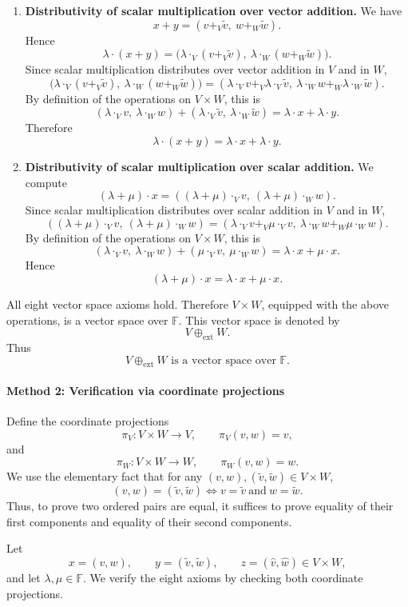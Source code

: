 \documentclass[12pt]{article}
\begin{document}
\begin{enumerate}[label=\textbf{A\arabic*.}]
\newpage
\item \textbf{Distributivity of scalar multiplication over vector addition.}  
We have
\[
x+y=(v+_V\tilde v,\ w+_W\tilde w).
\]
Hence
\[
\lambda\cdot (x+y)
=
\bigl(\lambda\cdot_V(v+_V\tilde v),\ \lambda\cdot_W(w+_W\tilde w)\bigr).
\]
Since scalar multiplication distributes over vector addition in \(V\) and in \(W\),
\[
\bigl(\lambda\cdot_V(v+_V\tilde v),\ \lambda\cdot_W(w+_W\tilde w)\bigr)
=
(\lambda\cdot_V v+_V\lambda\cdot_V\tilde v,\ \lambda\cdot_W w+_W\lambda\cdot_W\tilde w).
\]
By definition of the operations on \(V\times W\), this is
\[
(\lambda\cdot_V v,\ \lambda\cdot_W w)+(\lambda\cdot_V\tilde v,\ \lambda\cdot_W\tilde w)
=
\lambda\cdot x+\lambda\cdot y.
\]
Therefore
\[
\lambda\cdot(x+y)=\lambda\cdot x+\lambda\cdot y.
\]

\item \textbf{Distributivity of scalar multiplication over scalar addition.}  
We compute
\[
(\lambda+\mu)\cdot x
=
((\lambda+\mu)\cdot_V v,\ (\lambda+\mu)\cdot_W w).
\]
Since scalar multiplication distributes over scalar addition in \(V\) and in \(W\),
\[
((\lambda+\mu)\cdot_V v,\ (\lambda+\mu)\cdot_W w)
=
(\lambda\cdot_V v+_V\mu\cdot_V v,\ \lambda\cdot_W w+_W\mu\cdot_W w).
\]
By definition of the operations on \(V\times W\), this is
\[
(\lambda\cdot_V v,\ \lambda\cdot_W w)+(\mu\cdot_V v,\ \mu\cdot_W w)
=
\lambda\cdot x+\mu\cdot x.
\]
Hence
\[
(\lambda+\mu)\cdot x=\lambda\cdot x+\mu\cdot x.
\]
\end{enumerate}

All eight vector space axioms hold. Therefore \(V\times W\), equipped with the above operations, is a vector space over \(\mathbb F\). This vector space is denoted by
\[
V\oplus_{\mathrm{ext}}W.
\]
Thus
\[
\boxed{V\oplus_{\mathrm{ext}}W\text{ is a vector space over }\mathbb F.}
\]

\newpage
\paragraph{Method 2: Verification via coordinate projections}
Define the coordinate projections
\[
\pi_V:V\times W\to V,\qquad \pi_V(v,w)=v,
\]
and
\[
\pi_W:V\times W\to W,\qquad \pi_W(v,w)=w.
\]
We use the elementary fact that for any \((v,w),(\tilde v,\tilde w)\in V\times W\),
\[
(v,w)=(\tilde v,\tilde w)
\iff
v=\tilde v\ \text{and}\ w=\tilde w.
\]
Thus, to prove two ordered pairs are equal, it suffices to prove equality of their first components and equality of their second components.

Let
\[
x=(v,w),\qquad y=(\tilde v,\tilde w),\qquad z=(\hat v,\hat w)\in V\times W,
\]
and let \(\lambda,\mu\in\mathbb F\). We verify the eight axioms by checking both coordinate projections.
\end{document}
